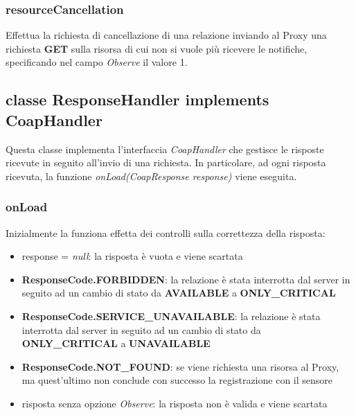 			\subsubsection{resourceCancellation}
				Effettua la richiesta di cancellazione di una relazione inviando al Proxy una richiesta \textbf{GET} sulla risorsa di cui non si vuole più ricevere le notifiche, specificando nel campo \textit{Observe} il valore 1.
				

		\subsection{classe ResponseHandler implements CoapHandler}
			Questa classe implementa l'interfaccia \textit{CoapHandler} che gestisce le risposte ricevute in seguito all'invio di una richiesta. In particolare, ad ogni risposta ricevuta, la funzione \textit{onLoad(CoapResponse response)} viene eseguita.
			\subsubsection{onLoad}
				Inizialmente la funziona effetta dei controlli sulla correttezza della risposta:
				\begin{itemize}
					\item response = \textit{null}: la risposta è vuota e viene scartata
					\item \textbf{ResponseCode.FORBIDDEN}: la relazione è stata interrotta dal server in seguito ad un cambio di stato da \textbf{AVAILABLE} a \textbf{ONLY\_CRITICAL}
					\item \textbf{ResponseCode.SERVICE\_UNAVAILABLE}: la relazione è stata interrotta dal server in seguito ad un cambio di stato da 						\textbf{ONLY\_CRITICAL} a \textbf{UNAVAILABLE}
					\item \textbf{ResponseCode.NOT\_FOUND}: se viene richiesta una risorsa al Proxy, ma quest'ultimo non conclude con successo la registrazione con il sensore
					\item risposta senza opzione \textit{Observe}: la risposta non è valida e viene scartata
				\end{itemize}
				

